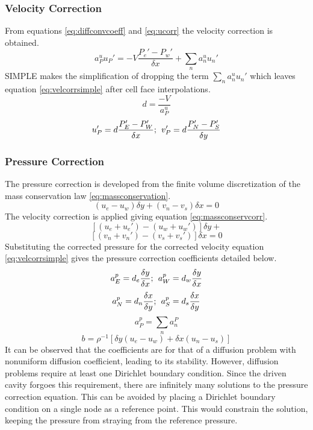 \documentclass[12pt,twocolumn]{article}
\begin{document}
\subsubsection*{Velocity Correction}
From equations \eqref{eq:diffconvcoeff} and \eqref{eq:ucorr} the velocity correction is obtained.
\begin{equation}\label{eq:velcorr}a_P^uu_P' = -V\frac{P_e'-P_w'}{\delta x} + \sum\limits_n a_n^uu_n'\end{equation}
SIMPLE makes the simplification of dropping the term $\sum\limits_n a_n^u u_n'$ which leaves equation \eqref{eq:velcorrsimple} after cell face interpolations.
\[d = \frac{-V}{a_P^u}\]
\begin{equation}\label{eq:velcorrsimple}u_P' = d\frac{P_E'-P_W'}{\delta x};\hspace{1ex}v_P' = d\frac{P_N'-P_S'}{\delta y}\end{equation}

\subsubsection*{Pressure Correction}
The pressure correction is developed from the finite volume discretization of the mass conservation law \eqref{eq:massconservation}.
\begin{equation}(u_e-u_w)\delta y+(v_n-v_s)\delta x = 0\end{equation}
The velocity correction is applied giving equation \eqref{eq:massconservcorr}.
\begin{equation}\label{eq:massconservcorr}[(u_e+u_e')-(u_w+u_w')]\delta y+\end{equation}
\[[(v_n+v_n')-(v_s+v_s')]\delta x = 0\]
Substituting the corrected pressure for the corrected velocity equation \eqref{eq:velcorrsimple} gives the pressure correction coefficients detailed below.
\[a_E^p = d_e \frac{\delta y}{\delta x};\hspace{1ex}a_W^p = d_w \frac{\delta y}{\delta x}\]
\[a_N^p = d_n\frac{\delta x}{\delta y};\hspace{1ex}a_S^p = d_s \frac{\delta x}{\delta y}\]
\[a_P^p = \sum_n a_n^P\]
\[b = \rho^{-1} [\delta y(u_e-u_w)+ \delta x (u_n-u_s)]\]
It can be observed that the coefficients are for that of a diffusion problem with nonuniform diffusion coefficient, leading to its stability.
However, diffusion problems require at least one Dirichlet boundary condition.
Since the driven cavity forgoes this requirement, there are infinitely many solutions to the pressure correction equation.
This can be avoided by placing a Dirichlet boundary condition on a single node as a reference point.
This would constrain the solution, keeping the pressure from straying from the reference pressure.
\end{document}
